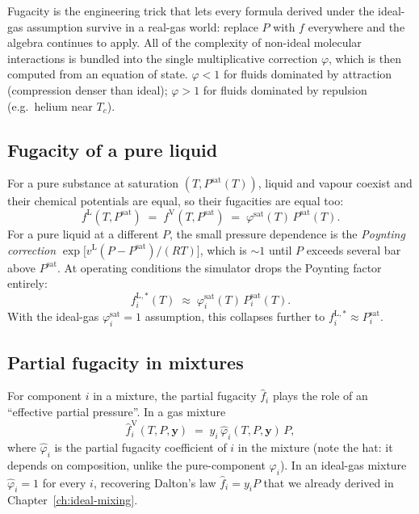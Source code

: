 \documentclass[11pt,a4paper]{article}
\begin{document}
\begin{intuition}
Fugacity is the engineering trick that lets every formula derived
under the ideal-gas assumption survive in a real-gas world: replace
$P$ with $f$ everywhere and the algebra continues to apply.  All of
the complexity of non-ideal molecular interactions is bundled into
the single multiplicative correction $\varphi$, which is then
computed from an equation of state.  $\varphi < 1$ for fluids
dominated by attraction (compression denser than ideal); $\varphi
> 1$ for fluids dominated by repulsion (e.g.\ helium near $T_c$).
\end{intuition}

\subsection{Fugacity of a pure liquid}

For a pure substance at saturation $(T, P^{\mathrm{sat}}(T))$,
liquid and vapour coexist and their chemical potentials are equal,
so their fugacities are equal too:
\begin{equation}
   f^{\mathrm{L}}(T, P^{\mathrm{sat}}) \;=\;
   f^{\mathrm{V}}(T, P^{\mathrm{sat}}) \;=\;
   \varphi^{\mathrm{sat}}(T)\,P^{\mathrm{sat}}(T).
\end{equation}
For a pure liquid at a different $P$, the small pressure
dependence is the \emph{Poynting correction}
$\exp\!\bigl[v^{\mathrm{L}}(P - P^{\mathrm{sat}})/(RT)\bigr]$, which is
$\sim 1$ until $P$ exceeds several bar above $P^{\mathrm{sat}}$.
At operating conditions the simulator drops the Poynting
factor entirely:
\begin{equation}
   f^{\mathrm{L},*}_i(T) \;\approx\; \varphi_i^{\mathrm{sat}}(T)\,P_i^{\mathrm{sat}}(T).
   \label{eq:fugacity-pure-liq}
\end{equation}
With the ideal-gas $\varphi_i^{\mathrm{sat}} = 1$ assumption, this
collapses further to $f^{\mathrm{L},*}_i \approx P_i^{\mathrm{sat}}$.

\subsection{Partial fugacity in mixtures}

For component $i$ in a mixture, the partial fugacity $\hat f_i$
plays the role of an ``effective partial pressure''.  In a gas
mixture
\begin{equation}
   \hat f_i^{\mathrm{V}}(T, P, \mathbf{y})
   \;=\; y_i\,\hat\varphi_i(T, P, \mathbf{y})\,P,
   \label{eq:fugacity-vap-mix}
\end{equation}
where $\hat\varphi_i$ is the partial fugacity coefficient of $i$ in
the mixture (note the hat: it depends on composition, unlike the
pure-component $\varphi_i$).  In an ideal-gas mixture
$\hat\varphi_i = 1$ for every $i$, recovering Dalton's law $\hat
f_i = y_i P$ that we already derived in
Chapter~\ref{ch:ideal-mixing}.
\end{document}
